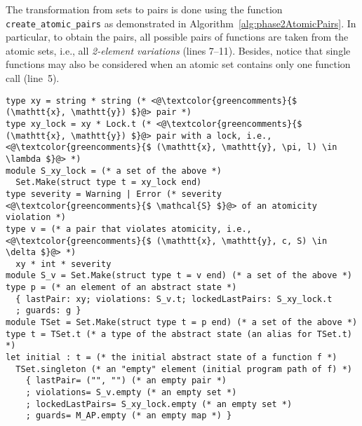 The transformation from sets to pairs is done using the function \texttt{create\_atomic\_pairs} as demonstrated in Algorithm~\ref{alg:phase2AtomicPairs}. In particular, to obtain the pairs, all possible pairs of functions are taken from the atomic sets, i.e., all \emph{2-element variations} (lines 7--11). Besides, notice that single functions may also be considered when an atomic set contains only one function call (line~5).

\begin{lstlisting}[style=ocaml, label={list:phase2AbsState}, float=hbt, caption={A~definition of the \emph{abstract state} in Phase~2}]
type xy = string * string (* <@\textcolor{greencomments}{$ (\mathtt{x}, \mathtt{y}) $}@> pair *)
type xy_lock = xy * Lock.t (* <@\textcolor{greencomments}{$ (\mathtt{x}, \mathtt{y}) $}@> pair with a lock, i.e., <@\textcolor{greencomments}{$ (\mathtt{x}, \mathtt{y}, \pi, l) \in \lambda $}@> *)
module S_xy_lock = (* a set of the above *)
  Set.Make(struct type t = xy_lock end)
type severity = Warning | Error (* severity <@\textcolor{greencomments}{$ \mathcal{S} $}@> of an atomicity violation *)
type v = (* a pair that violates atomicity, i.e., <@\textcolor{greencomments}{$ (\mathtt{x}, \mathtt{y}, c, S) \in \delta $}@> *)
  xy * int * severity
module S_v = Set.Make(struct type t = v end) (* a set of the above *)
type p = (* an element of an abstract state *)
  { lastPair: xy; violations: S_v.t; lockedLastPairs: S_xy_lock.t
  ; guards: g }
module TSet = Set.Make(struct type t = p end) (* a set of the above *)
type t = TSet.t (* a type of the abstract state (an alias for TSet.t) *)
let initial : t = (* the initial abstract state of a function f *)
  TSet.singleton (* an "empty" element (initial program path of f) *)
    { lastPair= ("", "") (* an empty pair *)
    ; violations= S_v.empty (* an empty set *)
    ; lockedLastPairs= S_xy_lock.empty (* an empty set *)
    ; guards= M_AP.empty (* an empty map *) }
\end{lstlisting}

